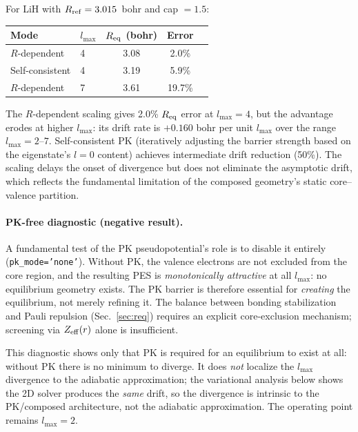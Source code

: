 \documentclass[aps,pra,twocolumn,superscriptaddress,longbibliography,floatfix]{revtex4-2}
\begin{document}
For LiH with $R_{\rm ref} = 3.015$~bohr and cap $= 1.5$:

\begin{center}
\begin{tabular}{llccc}
\hline
Mode & $l_{\max}$ & $R_{\rm eq}$ (bohr) & Error \\
\hline
$R$-dependent     & 4 & 3.08 &  2.0\% \\
Self-consistent   & 4 & 3.19 &  5.9\% \\
$R$-dependent     & 7 & 3.61 & 19.7\% \\
\hline
\end{tabular}
\end{center}

\noindent
The $R$-dependent scaling gives 2.0\% $R_{\rm eq}$ error at
$l_{\max} = 4$, but the advantage erodes at higher
$l_{\max}$: its drift rate is $+0.160$ bohr per unit $l_{\max}$
over the range $l_{\max} = 2$--$7$.  Self-consistent PK (iteratively
adjusting the barrier strength based on the eigenstate's $l = 0$
content) achieves intermediate drift reduction (50\%).  The scaling
delays the onset of divergence but does not eliminate the asymptotic
drift, which reflects the fundamental limitation of the composed
geometry's static core--valence partition.

\paragraph{PK-free diagnostic (negative result).}
A fundamental test of the PK pseudopotential's role is to disable it
entirely (\texttt{pk\_mode='none'}).  Without PK, the valence
electrons are not excluded from the core region, and the resulting
PES is \emph{monotonically attractive} at all $l_{\max}$: no
equilibrium geometry exists.  The PK barrier is therefore essential
for \emph{creating} the equilibrium, not merely refining it.  The
balance between bonding stabilization and Pauli repulsion
(Sec.~\ref{sec:req}) requires an explicit core-exclusion mechanism;
screening via $Z_{\rm eff}(r)$ alone is insufficient.

This diagnostic shows only that PK is required for an equilibrium to
exist at all: without PK there is no minimum to diverge.  It does
\emph{not} localize the $l_{\max}$ divergence to the adiabatic
approximation; the variational analysis below shows the 2D solver
produces the \emph{same} drift, so the divergence is intrinsic to the
PK/composed architecture, not the adiabatic approximation.  The operating point remains $l_{\max} = 2$.
\end{document}
